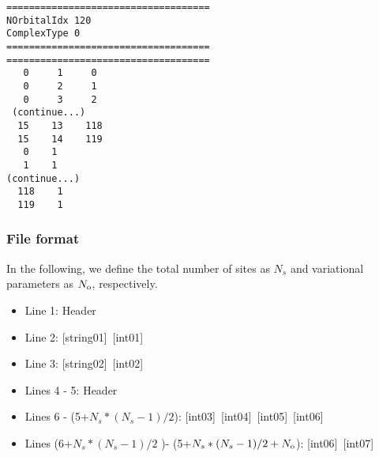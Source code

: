 \begin{minipage}{12.5cm}
\begin{screen}
\begin{verbatim}
====================================
NOrbitalIdx 120  
ComplexType 0
====================================
====================================
   0     1     0
   0     2     1 
   0     3     2 
 (continue...)
  15    13    118
  15    14    119
   0    1 
   1    1 
(continue...)
  118    1 
  119    1 
\end{verbatim}
\end{screen}
\end{minipage}

\subsubsection{File format}
In the following, we define the total number of sites as $N_s$ and variational parameters as $N_{\rm o}$, respectively.  

 \begin{itemize}
   \item  Line 1: Header
   \item  Line 2: [string01]~[int01]
   \item  Line 3: [string02]~[int02]
   \item  Lines 4 - 5:  Header
   \item  Lines 6 - (5+$N_s*(N_s-1)/2$): [int03]~[int04]~[int05]~[int06]
   \item  Lines (6+$N_s*(N_s-1)/2$ )- (5+$N_s*(N_s-1)/2+N_{\rm o}$): [int06]~[int07]
  \end{itemize}
